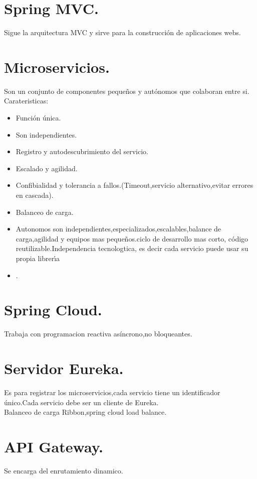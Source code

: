 \section{Spring MVC.}
Sigue la arquitectura MVC  y sirve para la construcci\'on de aplicaciones webs.
\section{Microservicios.}
Son un conjunto de componentes peque\~nos y aut\'onomos que colaboran entre si.\\
Carateristicas:
\begin{itemize}
	\item Funci\'on \'unica.
	\item Son independientes.
	\item Registro y autodescubrimiento del servicio.
	\item Escalado  y agilidad.
	\item Confibialidad y tolerancia a fallos.(Timeout,servicio alternativo,evitar errores en cascada).
	\item Balanceo de carga.
	\item Autonomos son independientes,especializados,escalables,balance de carga,agilidad y equipos  mas peque\~nos.ciclo de desarrollo mas corto, c\'odigo reutilizable.Independencia tecnologtica, es decir cada servicio puede usar su propia librer\'\i{}a
	\item .
\end{itemize}

\section{Spring Cloud.}
Trabaja con programacion reactiva asíncrono,no bloqueantes.
\section{Servidor Eureka.}
Es para registrar los microservicios,cada servicio tiene un identificador \'unico.Cada servicio debe 
ser un cliente de Eureka.\\
Balanceo de carga Ribbon,spring cloud load balance.
\section{API Gateway.}
Se encarga del enrutamiento dinamico.

